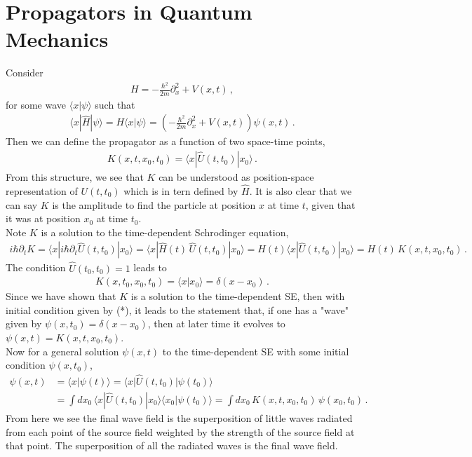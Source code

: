 \documentclass[11pt, onesided]{book}
\theoremstyle{break}
\theoremstyle{break}
\newcommand{\pd}{\partial}
\begin{document}
\section{Propagators in Quantum Mechanics}
Consider 
\begin{align*}
H = -\frac{\hbar^2}{2m}\pd_x^2 + V(x,t)\,,
\end{align*}
for some wave $\langle x|\psi\rangle$ such that 
\begin{align*}
\langle x | \hat{H}| \psi\rangle = H\langle x|\psi\rangle = \left(-\frac{\hbar^2}{2m}\pd_x^2 + V(x,t)\right) \psi(x,t)\,.
\end{align*}
Then we can define the propagator as a function of two space-time points, 
\begin{align*}
K(x,t,x_0,t_0) = \langle x|\hat{U}(t,t_0)|x_0\rangle\,.
\end{align*}
From this structure, we see that $K$ can be understood as position-space representation of $U(t,t_0)$ which is in tern defined by $\hat{H}$. It is also clear that we can say $K$ is the amplitude to find the particle at position $x$ at time $t$, given that it was at position $x_0$ at time $t_0$.\\

Note $K$ is a solution to the time-dependent Schrodinger equation, 
\begin{align*}
i\hbar \pd_t K = \langle x |i\hbar \pd_t \hat{U}(t,t_0) | x_0\rangle = \langle x |\hat{H}(t) \, \hat{U}(t,t_0) |x_0\rangle = H(t) \langle x |\hat{U}(t,t_0)|x_0\rangle = H(t) \, K(x,t,x_0,t_0)\,.
\end{align*}
The condition $\hat{U}(t_0,t_0) = 1$ leads to
\begin{align*}
K(x,t_0,x_0,t_0) = \langle x|x_0\rangle = \delta(x-x_0)\,. \tag{*}
\end{align*}
Since we have shown that $K$ is a solution to the time-dependent SE, then with initial condition given by (*), it leads to the statement that, if one has a "wave" given by $\psi(x,t_0) = \delta(x-x_0) $, then at later time it evolves to $\psi(x,t) = K(x,t,x_0,t_0)$.\\

Now for a general solution $\psi(x,t)$ to the time-dependent SE with some initial condition $\psi(x,t_0)$, 
\begin{align*}
\psi(x,t) &= \langle x|\psi(t) \rangle = \langle x |\hat{U}(t,t_0) | \psi(t_0)\rangle \\
&= \int dx_0 \, \langle x | \hat{U} (t,t_0)|x_0\rangle\langle x_0 | \psi(t_0)\rangle = \int dx_0\, K(x,t,x_0,t_0)\, \psi(x_0,t_0)\,.
\end{align*}
From here we see the final wave field is the superposition of little waves radiated from each point of the source field weighted by the strength of the source field at that point. The superposition of all the radiated waves is the final wave field.\\
\end{document}
